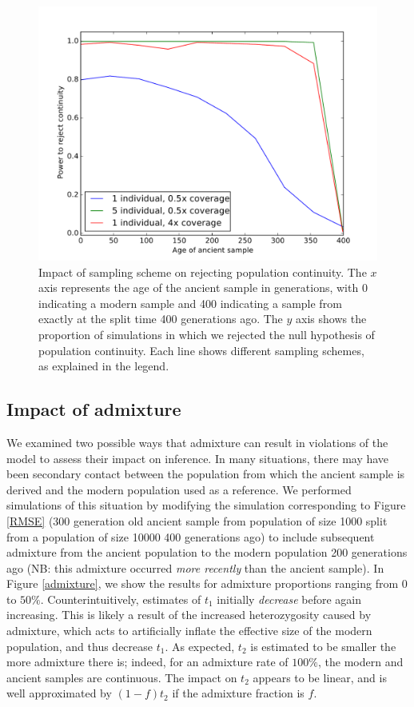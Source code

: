 \documentclass[11pt, oneside]{article}   	%
\begin{document}
\begin{figure}[!h] %
   \centering
   \includegraphics[width=\textwidth]{continuity_rejection.pdf} 
   \caption{Impact of sampling scheme on rejecting population continuity. The $x$ axis represents the age of the ancient sample in generations, with 0 indicating a modern sample and 400 indicating a sample from exactly at the split time 400 generations ago. The $y$ axis shows the proportion of simulations in which we rejected the null hypothesis of population continuity. Each line shows different sampling schemes, as explained in the legend.}
   \label{continuity}
\end{figure}

\subsection{Impact of admixture}
We examined two possible ways that admixture can result in violations of the model to assess their impact on inference. In many situations, there may have been secondary contact between the population from which the ancient sample is derived and the modern population used as a reference. We performed simulations of this situation by modifying the simulation corresponding to Figure \ref{RMSE} (300 generation old ancient sample from population of size 1000 split from a population of size 10000 400 generations ago) to include subsequent admixture from the ancient population to the modern population 200 generations ago (NB: this admixture occurred \emph{more recently} than the ancient sample). In Figure \ref{admixture}, we show the results for admixture proportions ranging from $0$ to $50\%$. Counterintuitively, estimates of $t_1$ initially \emph{decrease} before again increasing. This is likely a result of the increased heterozygosity caused by admixture, which acts to artificially inflate the effective size of the modern population, and thus decrease $t_1$. As expected, $t_2$ is estimated to be smaller the more admixture there is; indeed, for an admixture rate of $100\%$, the modern and ancient samples are continuous. The impact on $t_2$ appears to be linear, and is well approximated by $(1-f)t_2$ if the admixture fraction is $f$. 
\end{document}
